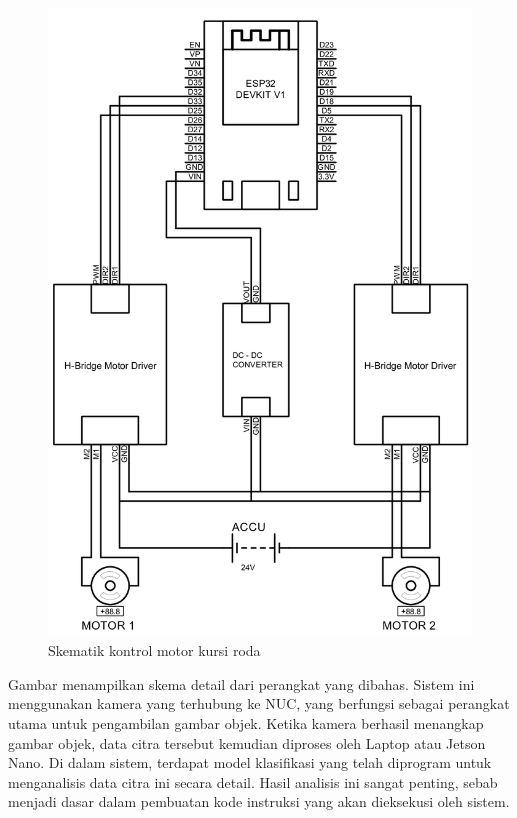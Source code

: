 \begin{figure}[H]
  \centering

  \includegraphics[scale=0.3]{gambar/Schematics.png}

  \caption{Skematik kontrol motor kursi roda}
  \label{fig:roketluarangkasa}
\end{figure}

Gambar menampilkan skema detail dari perangkat yang dibahas. Sistem ini menggunakan kamera yang terhubung ke NUC, yang berfungsi sebagai perangkat utama untuk pengambilan gambar objek. Ketika kamera berhasil menangkap gambar objek, data citra tersebut kemudian diproses oleh Laptop atau Jetson Nano. Di dalam sistem, terdapat model klasifikasi yang telah diprogram untuk menganalisis data citra ini secara detail. Hasil analisis ini sangat penting, sebab menjadi dasar dalam pembuatan kode instruksi yang akan dieksekusi oleh sistem.

